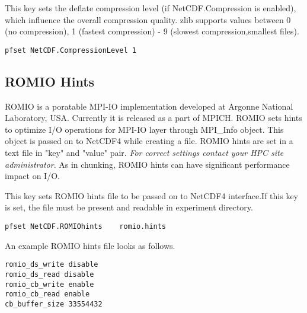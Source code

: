 {This key sets the deflate compression level (if NetCDF.Compression is enabled), which influence the overall compression quality. zlib supports values between 0 (no compression), 1 (fastest compression) - 9 (slowest compression,smallest files). }
\begin{display}\begin{verbatim}
pfset NetCDF.CompressionLevel 1
\end{verbatim}\end{display}

\subsection{ROMIO Hints}
ROMIO is a poratable MPI-IO implementation developed at Argonne National Laboratory, USA. Currently it is released as a part of MPICH. ROMIO sets hints to optimize I/O operations for MPI-IO layer through MPI\_Info object. This object is passed on to NetCDF4 while creating a file. ROMIO hints are set in a text file in "key" and "value" pair. \textit{For correct settings contact your HPC site administrator}. As in chunking, ROMIO hints can have significant performance impact on I/O.

{This key sets ROMIO hints file to be passed on to NetCDF4 interface.If this key is set, the file must be present and readable in experiment directory.}
\begin{display}\begin{verbatim}
pfset NetCDF.ROMIOhints    romio.hints
\end{verbatim}\end{display}
An example ROMIO hints file looks as follows.
\begin{display}\begin{verbatim}
romio_ds_write disable
romio_ds_read disable
romio_cb_write enable
romio_cb_read enable
cb_buffer_size 33554432
\end{verbatim}\end{display}

